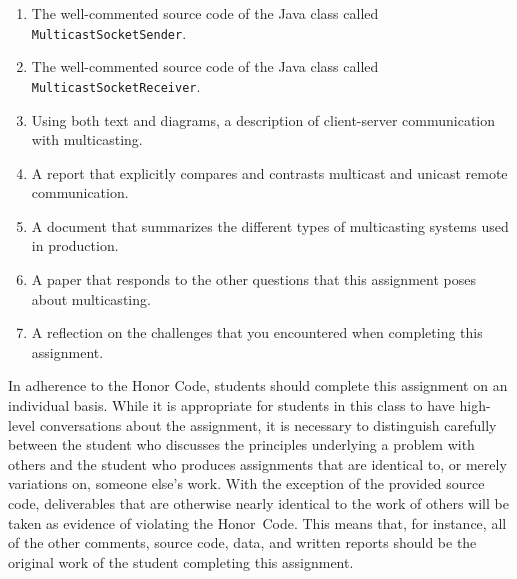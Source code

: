 \vspace*{-.1in}

\begin{enumerate}
  \itemsep 0em

  \item The well-commented source code of the Java class called {\tt MulticastSocketSender}.

  \item The well-commented source code of the Java class called {\tt MulticastSocketReceiver}.

  \item Using both text and diagrams, a description of client-server communication with multicasting.

  \item A report that explicitly compares and contrasts multicast and unicast remote communication.

  \item A document that summarizes the different types of multicasting systems used in production.

  \item A paper that responds to the other questions that this assignment poses about multicasting.

  \item A reflection on the challenges that you encountered when completing this assignment.

\end{enumerate}

\vspace*{-.1in}


In adherence to the Honor Code, students should complete this assignment on an individual basis. While it is appropriate
for students in this class to have high-level conversations about the assignment, it is necessary to distinguish
carefully between the student who discusses the principles underlying a problem with others and the student who produces
assignments that are identical to, or merely variations on, someone else's work.  With the exception of the provided
source code, deliverables that are otherwise nearly identical to the work of others will be taken as evidence of
violating the \mbox{Honor Code}. This means that, for instance, all of the other comments, source code, data, and
written reports should be the original work of the student completing this assignment.



